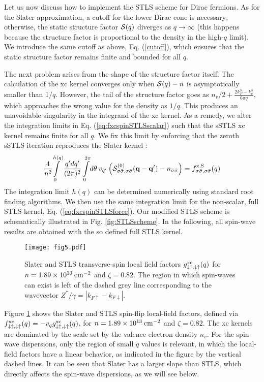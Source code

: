 \documentclass[aps,prb,twocolumn,superscriptaddress]{revtex4-2}
\newcommand{\SC}{{\cal S}}
\newcommand{\kf}{k_F}
\newcommand{\bfq}{{\bf q}}
\newcommand{\ua}{\uparrow}
\newcommand{\da}{\downarrow}
\newcommand{\ku}{k_{F\ua}}
\newcommand{\kd}{k_{F\da}}
\begin{document}
Let us now discuss how to implement the STLS scheme for Dirac fermions.
As for the Slater approximation, a cutoff for the lower Dirac cone is necessary; otherwise, the static structure factor $\SC(q)$ diverges as $q\rightarrow\infty$
(this  happens because the structure factor is proportional to the density in the high-$q$ limit).
We introduce the same cutoff as above, Eq. (\ref{cutoff}), which ensures that the static structure factor remains finite and bounded for all $q$.


The next problem arises from the shape of the structure factor itself.
The calculation of the xc kernel converges only when $\SC(q)-n$ is asymptotically smaller than $1/q$.
However, the tail of the structure factor goes as $n_v/2 + \frac{2\kf^3-k_v^3}{6\pi q}$, which
approaches the wrong value for the density as $1/q$.
This produces an unavoidable singularity in the integrand of the xc kernel.
As a remedy, we alter the integration limits in Eq. (\ref{eq:fxcspinSTLSscalar}) such that the sSTLS xc kernel remains finite for all $q$.
We fix this limit by enforcing that the zeroth sSTLS iteration reproduces the Slater kernel \cite{GiulianiVignale,Ullrich2018}:
\begin{equation}
  \frac{4}{n^2}\! \!\int\limits_0^{h(q)} \frac{q'dq'}{(2\pi)^2} \int\limits_0^{2\pi} \! d\theta \: v_{q'}
  \left(\SC_{\sigma\bar\sigma,\sigma\bar\sigma}^{(0)}(\bfq - \bfq') - n_{\bar\sigma\bar\sigma}\right) = f^{\rm x,S}_{\sigma\bar\sigma,\sigma\bar\sigma}(q)
\end{equation}
The integration limit $h(q)$ can be determined numerically using standard root finding algorithms.
We then use the same integration limit for the non-scalar, full STLS kernel, Eq. (\ref{eq:fxcspinSTLSforce}).
Our modified STLS scheme is schematically illustrated in Fig. \ref{fig:STLSscheme}. In the following, all spin-wave results are
obtained with the so defined full STLS kernel.

\begin{figure}
  \texttt{[image: fig5.pdf]}
  \caption{Slater and STLS transverse-spin local field factors $g^{\rm xc}_{\da\ua,\da\ua}(q)$ for $n = 1.89 \times 10^{13}\: \rm cm^{-2}$ and $\zeta = 0.82$.
           The region in which spin-waves can exist is left of the dashed grey line corresponding to the wavevector $Z^*/\gamma = |\ku-\kd|$.}
  \label{fig:LocalFieldExample}
\end{figure}

Figure \ref{fig:LocalFieldExample} shows the Slater and STLS spin-flip local-field factors, defined via
$f^{\rm xc}_{\da\ua,\da\ua}(q) = -v_q  g^{\rm xc}_{\da\ua,\da\ua}(q)$, for $n = 1.89 \times 10^{13}\: \rm cm^{-2}$ and $\zeta = 0.82$.
The xc kernels are dominated by the scale set by the valence electron density $n_v$.
For the spin-wave dispersions, only the region of small $q$ values is relevant, in which the local-field factors have a linear behavior, as indicated
in the figure by the vertical dashed lines. It can be seen that Slater has a larger slope than STLS, which directly affects the spin-wave dispersions, as we
will see below.
\end{document}
